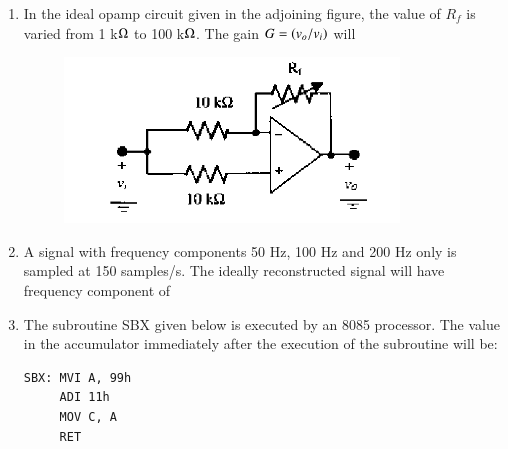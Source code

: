 \documentclass[journal,12pt,onecolumn]{IEEEtran}
\theoremstyle{remark}
\begin{document}
\begin{enumerate}
\item In the ideal opamp circuit given in the adjoining figure, the value of $R_f$ is varied from 1 k$\ohm$ to 100 k$\ohm$. The gain $G = \left(v_o/v_i\right)$ will
\begin{figure}[H]
    \centering
    \includegraphics[width = 0.7\columnwidth]{q18}
    \caption*{}
    \label{fig:Q18}
\end{figure}

\hfill{}
\begin{enumerate} 
 \end{enumerate}


\item A signal with frequency components 50 Hz, 100 Hz and 200 Hz only is sampled at 150 samples/s. The ideally reconstructed signal will have frequency component of

\hfill{}\begin{enumerate}  \end{enumerate}

\item The subroutine SBX given below is executed by an 8085 processor. The value in the accumulator immediately after the execution of the subroutine will be:
\begin{verbatim}
SBX: MVI A, 99h
     ADI 11h
     MOV C, A
     RET
\end{verbatim}


\end{enumerate}
\end{document}
